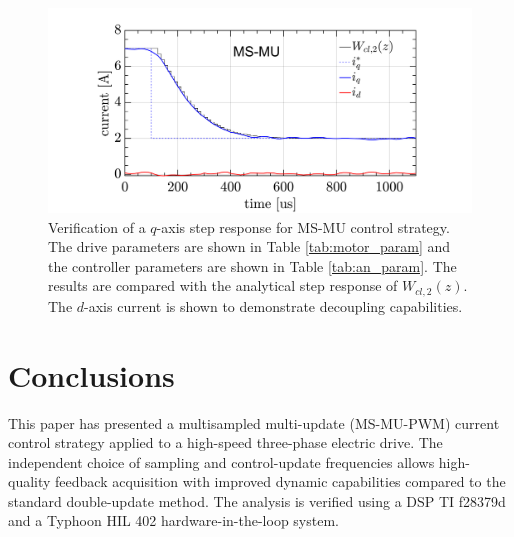 \documentclass[conference]{IEEEtran}
\begin{document}
\begin{figure}[t!]
    \centerline{\includegraphics[width=1\linewidth]{figures/ivan figs/MSMUstepHIL.png}}
    \caption{Verification of a $q$-axis step response for MS-MU control strategy. The drive parameters are shown in Table \ref{tab:motor_param} and the controller parameters are shown in Table \ref{tab:an_param}. The results are compared with the analytical step response of $W_{cl,2}(z)$. The $d$-axis current is shown to demonstrate decoupling capabilities.}
    \label{fig:MSMUmaf_step} 
\end{figure}


\section{Conclusions}
This paper has presented a multisampled multi-update (MS-MU-PWM) current control strategy applied to a high-speed three-phase electric drive. The independent choice of sampling and control-update frequencies allows high-quality feedback acquisition with improved dynamic capabilities compared to the standard double-update method. The analysis is verified using a DSP TI f28379d and a Typhoon HIL 402 hardware-in-the-loop system.

\ifCLASSOPTIONcaptionsoff
  \newpage
\fi



\end{document}
